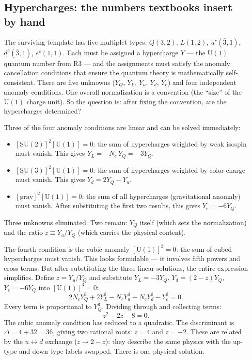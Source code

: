 \documentclass[11pt]{article}
\newenvironment{varlist}{\begin{itemize}[nosep,leftmargin=2em]}{\end{itemize}}
\newcommand{\SU}{\mathrm{SU}}
\newcommand{\U}{\mathrm{U}}
\begin{document}
\subsection{Hypercharges: the numbers textbooks insert by hand}

The surviving template has five multiplet types: $Q(3,2)$, $L(1,2)$, $u^c(\bar{3},1)$, $d^c(\bar{3},1)$, $e^c(1,1)$.  Each must be assigned a hypercharge $Y$ --- the $\U(1)$ quantum number from R3 --- and the assignments must satisfy the anomaly cancellation conditions that ensure the quantum theory is mathematically self-consistent.  There are five unknowns ($Y_Q$, $Y_L$, $Y_u$, $Y_d$, $Y_e$) and four independent anomaly conditions.  One overall normalization is a convention (the ``size'' of the $\U(1)$ charge unit).  So the question is: after fixing the convention, are the hypercharges determined?

Three of the four anomaly conditions are linear and can be solved immediately:

\begin{varlist}
\item $[\SU(2)]^2[\U(1)] = 0$: the sum of hypercharges weighted by weak isospin must vanish.  This gives $Y_L = -N_c \, Y_Q = -3 Y_Q$.
\item $[\SU(3)]^2[\U(1)] = 0$: the sum of hypercharges weighted by color charge must vanish.  This gives $Y_d = 2Y_Q - Y_u$.
\item $[\mathrm{grav}]^2[\U(1)] = 0$: the sum of all hypercharges (gravitational anomaly) must vanish.  After substituting the first two results, this gives $Y_e = -6 Y_Q$.
\end{varlist}

\noindent Three unknowns eliminated.  Two remain: $Y_Q$ itself (which sets the normalization) and the ratio $z \equiv Y_u / Y_Q$ (which carries the physical content).

The fourth condition is the cubic anomaly $[\U(1)]^3 = 0$: the sum of cubed hypercharges must vanish.  This looks formidable --- it involves fifth powers and cross-terms.  But after substituting the three linear solutions, the entire expression simplifies.  Define $z = Y_u / Y_Q$ and substitute $Y_L = -3Y_Q$, $Y_d = (2-z)Y_Q$, $Y_e = -6Y_Q$ into $[\U(1)]^3 = 0$:
\begin{equation}
2 N_c Y_Q^3 + 2 Y_L^3 - N_c Y_u^3 - N_c Y_d^3 - Y_e^3 = 0.
\end{equation}
Every term is proportional to $Y_Q^3$.  Dividing through and collecting terms:
\begin{equation}
z^2 - 2z - 8 = 0.
\label{eq:hypercharge_quadratic}
\end{equation}
The cubic anomaly condition has reduced to a quadratic.  The discriminant is $\Delta = 4 + 32 = 36$, giving two rational roots: $z = 4$ and $z = -2$.  These are related by the $u \leftrightarrow d$ exchange ($z \to 2 - z$): they describe the same physics with the up-type and down-type labels swapped.  There is one physical solution.
\end{document}
